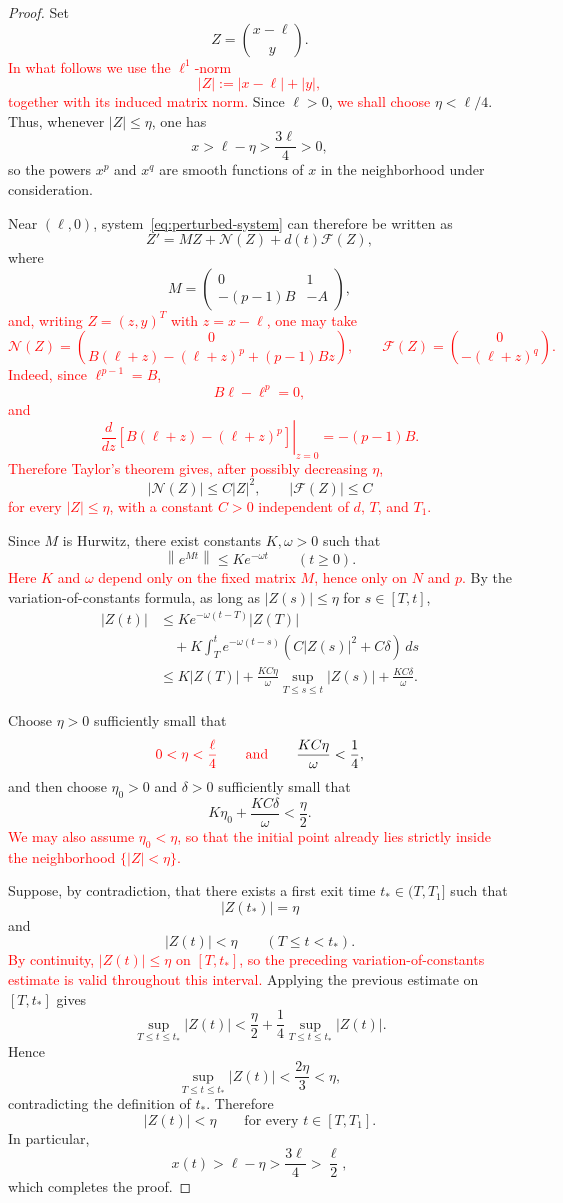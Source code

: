 \documentclass[11pt]{article}
\newcommand{\norm}[1]{\left\|#1\right\|}
\theoremstyle{definition}
\begin{document}
\begin{proof}
Set
\[
Z=
\binom{x-\ell}{y}.
\]
\textcolor{red}{In what follows we use the $\ell^1$-norm
\[
|Z|:=|x-\ell|+|y|,
\]
together with its induced matrix norm.}
Since $\ell>0$, \textcolor{red}{we shall choose} $\eta<\ell/4$.
Thus, whenever
$|Z|\leq\eta$, one has
\[
x>\ell-\eta>\frac{3\ell}{4}>0,
\]
so the powers $x^p$ and $x^q$ are smooth functions of $x$ in the
neighborhood under consideration.

Near $(\ell,0)$, system~\eqref{eq:perturbed-system} can therefore be
written as
\[
Z'
=
MZ+\mathcal N(Z)+d(t)\mathcal F(Z),
\]
where
\[
M=
\begin{pmatrix}
0&1\\
-(p-1)B&-A
\end{pmatrix},
\]
\textcolor{red}{and, writing $Z=(z,y)^T$ with $z=x-\ell$, one may take
\[
\mathcal N(Z)
=
\binom{0}{
B(\ell+z)-(\ell+z)^p+(p-1)Bz
},
\qquad
\mathcal F(Z)
=
\binom{0}{-(\ell+z)^q}.
\]
Indeed, since $\ell^{p-1}=B$,
\[
B\ell-\ell^p=0,
\]
and
\[
\left.
\frac{d}{dz}
\left[
B(\ell+z)-(\ell+z)^p
\right]
\right|_{z=0}
=
-(p-1)B.
\]
Therefore Taylor's theorem gives, after possibly decreasing $\eta$,}
\[
|\mathcal N(Z)|
\leq C|Z|^2,
\qquad
|\mathcal F(Z)|
\leq C
\]
\textcolor{red}{for every $|Z|\leq\eta$, with a constant $C>0$
independent of $d$, $T$, and $T_1$.}

Since $M$ is Hurwitz, there exist constants $K,\omega>0$ such that
\[
\norm{e^{Mt}}
\leq
Ke^{-\omega t}
\qquad
(t\geq0).
\]
\textcolor{red}{Here $K$ and $\omega$ depend only on the fixed matrix
$M$, hence only on $N$ and $p$.}
By the variation-of-constants formula, as long as $|Z(s)|\leq\eta$
for $s\in[T,t]$,
\begin{align*}
|Z(t)|
&\leq
Ke^{-\omega(t-T)}|Z(T)|
\\
&\quad
+
K\int_T^t
e^{-\omega(t-s)}
\left(
C|Z(s)|^2
+C\delta
\right)\,ds
\\
&\leq
K|Z(T)|
+
\frac{KC\eta}{\omega}
\sup_{T\leq s\leq t}|Z(s)|
+
\frac{KC\delta}{\omega}.
\end{align*}

Choose $\eta>0$ sufficiently small that
\[
\textcolor{red}{
0<\eta<\frac{\ell}{4}
\qquad\text{and}\qquad
}
\frac{KC\eta}{\omega}<\frac14,
\]
and then choose $\eta_0>0$ and $\delta>0$ sufficiently small that
\[
K\eta_0+\frac{KC\delta}{\omega}
<
\frac{\eta}{2}.
\]
\textcolor{red}{We may also assume $\eta_0<\eta$, so that the initial
point already lies strictly inside the neighborhood
$\{|Z|<\eta\}$.}

Suppose, by contradiction, that there exists a first exit time
$t_*\in(T,T_1]$ such that
\[
|Z(t_*)|=\eta
\]
and
\[
|Z(t)|<\eta
\qquad
(T\leq t<t_*).
\]
\textcolor{red}{By continuity, $|Z(t)|\leq\eta$ on $[T,t_*]$, so the
preceding variation-of-constants estimate is valid throughout this
interval.}
Applying the previous estimate on $[T,t_*]$ gives
\[
\sup_{T\leq t\leq t_*}|Z(t)|
<
\frac{\eta}{2}
+
\frac14
\sup_{T\leq t\leq t_*}|Z(t)|.
\]
Hence
\[
\sup_{T\leq t\leq t_*}|Z(t)|
<
\frac{2\eta}{3}
<\eta,
\]
contradicting the definition of $t_*$. Therefore
\[
|Z(t)|<\eta
\qquad
\text{for every }t\in[T,T_1].
\]
In particular,
\[
x(t)>\ell-\eta>\frac{3\ell}{4}>\frac{\ell}{2},
\]
which completes the proof.
\end{proof}
\end{document}
